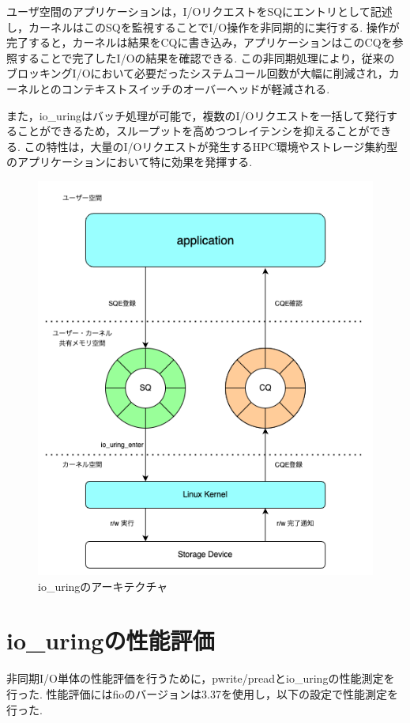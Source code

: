 \documentclass[a4paper,11pt]{jreport}
\begin{document}
ユーザ空間のアプリケーションは，I/OリクエストをSQにエントリとして記述し，カーネルはこのSQを監視することでI/O操作を非同期的に実行する.
操作が完了すると，カーネルは結果をCQに書き込み，アプリケーションはこのCQを参照することで完了したI/Oの結果を確認できる.
この非同期処理により，従来のブロッキングI/Oにおいて必要だったシステムコール回数が大幅に削減され，カーネルとのコンテキストスイッチのオーバーヘッドが軽減される.

また，io\_uringはバッチ処理が可能で，複数のI/Oリクエストを一括して発行することができるため，スループットを高めつつレイテンシを抑えることができる.
この特性は，大量のI/Oリクエストが発生するHPC環境やストレージ集約型のアプリケーションにおいて特に効果を発揮する.

\begin{figure}
	\centering
	\includegraphics[width=12cm, bb=0 0 503 591]{figures/io_uring_arch.png}
	\caption{io\_uringのアーキテクチャ}
	\label{fig:io_uring}
\end{figure}

\section{io\_uringの性能評価}\label{sec:io_uring_eval}
非同期I/O単体の性能評価を行うために，pwrite/preadとio\_uringの性能測定を行った.
性能評価にはfioのバージョンは3.37を使用し，以下の設定で性能測定を行った.
\end{document}

